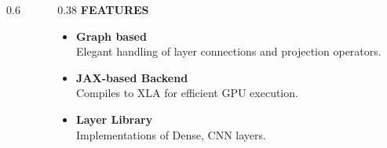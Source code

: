 \documentclass[t, xcolor=table, aspectratio=169]{beamer}
\begin{document}
\begin{frame}
\begin{columns}[onlytextwidth,T]
\begin{column}{0.6\textwidth}
{
                }
            \end{column}
            
            \begin{column}{0.38\textwidth}
                \textbf{FEATURES}
                \par\vspace{0.5em}
                \begin{itemize}
                    \item \textbf{Graph based} \\
                    \scriptsize Elegant  handling of layer connections and projection operators.
                    \vspace{0.5em}
                    
                    \item \textbf{JAX-based Backend} \\
                    \scriptsize Compiles to XLA for efficient GPU execution.
                    \vspace{0.5em}
                    
                    \item \textbf{Layer Library} \\
                    \scriptsize Implementations of Dense, CNN layers.
                \end{itemize}
            \end{column}
        \end{columns}
    \end{frame}
\end{document}

